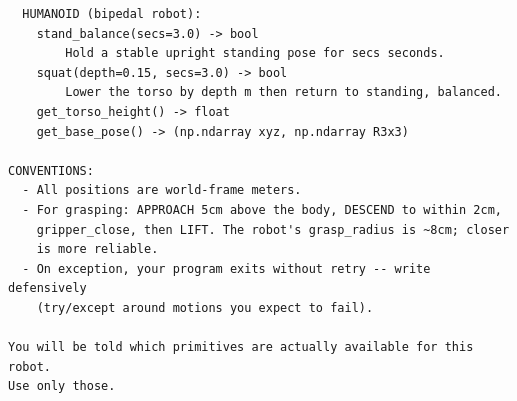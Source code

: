 {\begin{verbatim}
  HUMANOID (bipedal robot):
    stand_balance(secs=3.0) -> bool
        Hold a stable upright standing pose for secs seconds.
    squat(depth=0.15, secs=3.0) -> bool
        Lower the torso by depth m then return to standing, balanced.
    get_torso_height() -> float
    get_base_pose() -> (np.ndarray xyz, np.ndarray R3x3)

CONVENTIONS:
  - All positions are world-frame meters.
  - For grasping: APPROACH 5cm above the body, DESCEND to within 2cm,
    gripper_close, then LIFT. The robot's grasp_radius is ~8cm; closer
    is more reliable.
  - On exception, your program exits without retry -- write defensively
    (try/except around motions you expect to fail).

You will be told which primitives are actually available for this robot.
Use only those.
\end{verbatim}}
